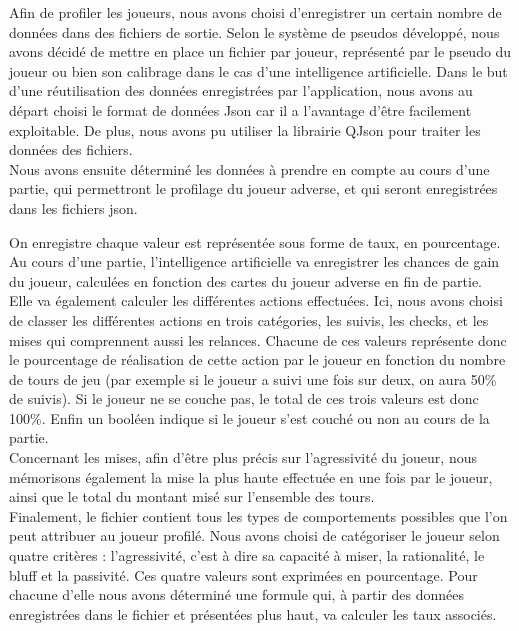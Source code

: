 \documentclass{report}
\begin{document}
\hspace{0.5cm}Afin de profiler les joueurs, nous avons choisi d'enregistrer un certain nombre de données dans des fichiers de sortie. Selon le système de pseudos développé, nous avons décidé de mettre en place un fichier par joueur, représenté par le pseudo du joueur ou bien son calibrage dans le cas d'une intelligence artificielle. Dans le but d'une réutilisation des données enregistrées par l'application, nous avons au départ choisi le format de données Json car il a l'avantage d'être facilement exploitable. De plus, nous avons pu utiliser la librairie QJson pour traiter les données des fichiers.\\

Nous avons ensuite déterminé les données à prendre en compte au cours d'une partie, qui permettront le profilage du joueur adverse, et qui seront enregistrées dans les fichiers json.\par
On enregistre chaque valeur est représentée sous forme de taux, en pourcentage.\\

Au cours d'une partie, l'intelligence artificielle va enregistrer les chances de gain du joueur, calculées en fonction des cartes du joueur adverse en fin de partie.\\

Elle va également calculer les différentes actions effectuées. Ici, nous avons choisi de classer les différentes actions en trois catégories, les suivis, les checks, et les mises qui comprennent aussi les relances. Chacune de ces valeurs représente donc le pourcentage de réalisation de cette action par le joueur en fonction du nombre de tours de jeu (par exemple si le joueur a suivi une fois sur deux, on aura 50\% de suivis). Si le joueur ne se couche pas, le total de ces trois valeurs est donc 100\%. Enfin un booléen indique si le joueur s'est couché ou non au cours de la partie.\\

Concernant les mises, afin d'être plus précis sur l'agressivité du joueur, nous mémorisons également la mise la plus haute effectuée en une fois par le joueur, ainsi que le total du montant misé sur l'ensemble des tours.\\

Finalement, le fichier contient tous les types de comportements possibles que l'on peut attribuer au joueur profilé. Nous avons choisi de catégoriser le joueur selon quatre critères : l'agressivité, c'est à dire sa capacité à miser, la rationalité, le bluff et la passivité. Ces quatre valeurs sont exprimées en pourcentage. Pour chacune d'elle nous avons déterminé une formule qui, à partir des données enregistrées dans le fichier et présentées plus haut, va calculer les taux associés.\\
\end{document}
